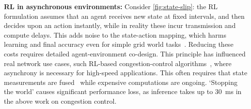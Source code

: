 \documentclass[
sigconf,natbib=false
,anonymous=true
,10pt
]{acmart}
\newcommand{\fakepara}[1]{\noindent\textbf{#1:}}
\newcounter{insightc}
\newenvironment{insight}
	{
		\begin{tipblock}\refstepcounter{insightc}\textbf{Insight \theinsightc:}\em
	}
	{
		\end{tipblock}
	}
\begin{document}

\fakepara{RL in asynchronous environments}
Consider \cref{fig:state-slip}: the RL formulation assumes that an agent receives new state at fixed intervals, and then decides upon an action instantly, while in reality these incur transmission and compute delays.
This adds noise to the state-action mapping, which harms learning and final accuracy even for simple grid world tasks~\parencite{DBLP:journals/firai/TravnikMSP18}.
Reducing these costs requires detailed agent-environment co-design.
This principle has influenced real network use cases, such RL-based congestion-control algorithms~\parencite{DBLP:journals/corr/abs-1910-04054}, where asynchrony is necessary for high-speed applications.
This often requires that state measurements are fused~\parencite{DBLP:journals/corr/abs-1910-04054,DBLP:journals/tnsm/SimpsonRP20} while expensive computations are ongoing.
`Stopping the world' causes significant performance loss, as inference takes up to \SI{30}{\milli\second} in the above work on congestion control.
\end{document}
